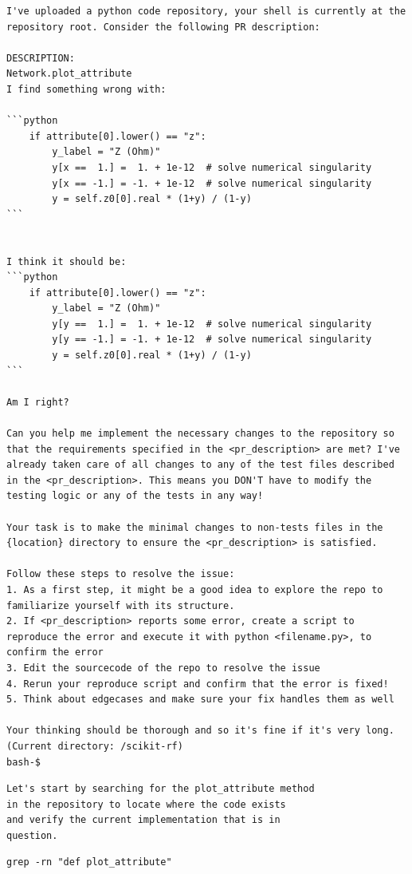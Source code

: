 \documentclass[dandb]{article}
\begin{document}
\begin{flushright}
  \begin{envmessage}
    \begin{lstlisting}[backgroundcolor=\color{green!5!white},frame=none]
I've uploaded a python code repository, your shell is currently at the repository root. Consider the following PR description:
  
DESCRIPTION:
Network.plot_attribute
I find something wrong with:

```python
    if attribute[0].lower() == "z":
        y_label = "Z (Ohm)"
        y[x ==  1.] =  1. + 1e-12  # solve numerical singularity
        y[x == -1.] = -1. + 1e-12  # solve numerical singularity
        y = self.z0[0].real * (1+y) / (1-y)
```


I think it should be:
```python
    if attribute[0].lower() == "z":
        y_label = "Z (Ohm)"
        y[y ==  1.] =  1. + 1e-12  # solve numerical singularity
        y[y == -1.] = -1. + 1e-12  # solve numerical singularity
        y = self.z0[0].real * (1+y) / (1-y)
```

Am I right?

Can you help me implement the necessary changes to the repository so that the requirements specified in the <pr_description> are met? I've already taken care of all changes to any of the test files described in the <pr_description>. This means you DON'T have to modify the testing logic or any of the tests in any way!

Your task is to make the minimal changes to non-tests files in the {location} directory to ensure the <pr_description> is satisfied.
  
Follow these steps to resolve the issue:
1. As a first step, it might be a good idea to explore the repo to familiarize yourself with its structure.
2. If <pr_description> reports some error, create a script to reproduce the error and execute it with python <filename.py>, to confirm the error
3. Edit the sourcecode of the repo to resolve the issue
4. Rerun your reproduce script and confirm that the error is fixed!
5. Think about edgecases and make sure your fix handles them as well

Your thinking should be thorough and so it's fine if it's very long.
(Current directory: /scikit-rf)
bash-$
    \end{lstlisting}
  \end{envmessage}
\end{flushright}


\begin{agentmessage}
\begin{lstlisting}[backgroundcolor=\color{blue!5!white},frame=none]
Let's start by searching for the plot_attribute method
in the repository to locate where the code exists
and verify the current implementation that is in
question.
\end{lstlisting}

\begin{lstlisting}[backgroundcolor=\color{white!10}]
grep -rn "def plot_attribute"
\end{lstlisting}
\end{agentmessage}
\end{document}
